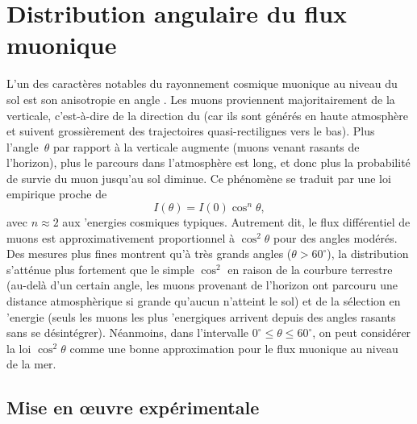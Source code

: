 \documentclass[a4paper,12pt,twoside]{article}
\begin{document}
\newpage

\section{Distribution angulaire du flux muonique}
L'un des caract\`eres notables du rayonnement cosmique muonique au niveau du sol est son anisotropie en angle . Les muons proviennent majoritairement de la verticale, c'est-\`a-dire de la direction du  (car ils sont g\'en\'er\'es en haute atmosph\`ere et suivent grossi\`erement des trajectoires quasi-rectilignes vers le bas). Plus l'angle~$\theta$ par rapport \`a la verticale augmente (muons venant rasants de l'horizon), plus le parcours dans l'atmosph\`ere est long, et donc plus la probabilit\'e de survie du muon jusqu'au sol diminue. Ce ph\'enom\`ene se traduit par une loi empirique proche de
\[
  I(\theta) = I(0)\cos^n\theta,
\]
avec $n \approx 2$ aux 'energies cosmiques typiques. Autrement dit, le flux diff\'erentiel de muons est approximativement proportionnel \`a $\cos^2\theta$ pour des angles mod\'er\'es. Des mesures plus fines montrent qu'\`a tr\`es grands angles ($\theta > 60^\circ$), la distribution s'att\'enue plus fortement que le simple $\cos^2$ en raison de la courbure terrestre (au-del\`a d'un certain angle, les muons provenant de l'horizon ont parcouru une distance atmosph\`erique si grande qu'aucun n'atteint le sol) et de la s\'election en 'energie (seuls les muons les plus 'energiques arrivent depuis des angles rasants sans se d\'esint\'egrer). N\'eanmoins, dans l'intervalle $0^\circ \le \theta \leq 60^\circ$, on peut consid\'erer la loi $\cos^2\theta$ comme une bonne approximation pour le flux muonique au niveau de la mer.

\subsection{Mise en œuvre expérimentale}
\end{document}
